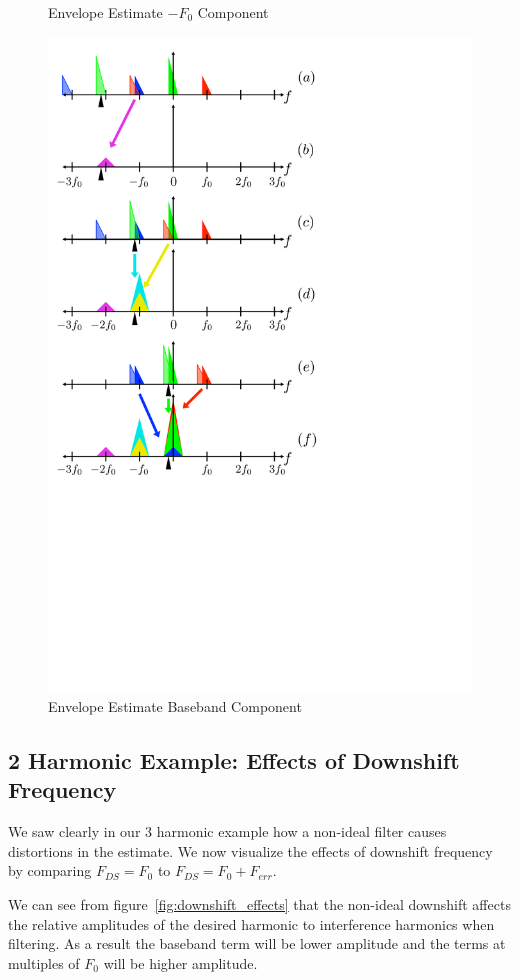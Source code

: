 \documentclass [11pt, proquest,oneside] {uwthesis}[2015/03/03]
\begin{document}
\begin{figure}[!ht]
    \caption{Envelope Estimate $-F_0$ Component}\label{fig:harmonic_envelope_F0}
    \includegraphics[width=.62\textwidth]{harmonic_envelope_0}
    \caption{Envelope Estimate Baseband Component}\label{fig:harmonic_envelope_0}
\end{figure}

\subsection{2 Harmonic Example: Effects of Downshift Frequency}

We saw clearly in our 3 harmonic example how a non-ideal filter causes distortions in the estimate.  We now visualize the effects of downshift frequency by comparing $F_{DS} = F_0$ to $F_{DS} = F_0 + F_{err}$.

We can see from figure~\ref{fig:downshift_effects} that the non-ideal downshift affects the relative amplitudes of the desired harmonic to interference harmonics when filtering.  As a result the baseband term will be lower amplitude and the terms at multiples of $F_0$ will be higher amplitude.
\end{document}
